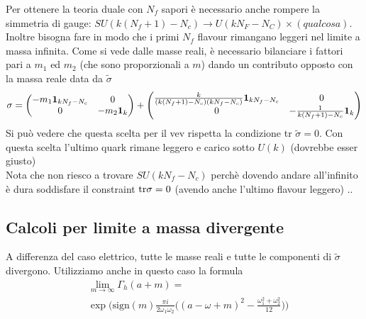 \documentclass[a4paper,12pt]{article}
\begin{document}
Per ottenere la teoria duale con $N_f$ sapori è necessario anche rompere la simmetria di gauge: $SU(k(N_f+1) -N_c) \rightarrow U( k N_F - N_C) \times (qualcosa)$. Inoltre bisogna fare in modo che i primi $N_f$ flavour rimangano leggeri nel limite a massa infinita. Come si vede dalle masse reali, è necessario bilanciare i fattori pari a $m_1$ ed $m_2$ (che sono proporzionali a $m$) dando un contributo opposto con la massa reale data da $\tilde{\sigma}$
\begin{equation}
 \sigma = 
 \begin{pmatrix}
  - m_1 \bold{ 1}_{ k N_f - N_c} & 0 \\
  0 &  - m_2 \bold{ 1}_{k}
 \end{pmatrix}
+
\begin{pmatrix}
   \frac{k}{( k(N_f+1)-N_c)( k N_f - N_c)} \bold{ 1}_{ k N_f - N_c} & 0 \\
  0 &  - \frac{1}{ k(N_f+1)-N_c} \bold{ 1}_{k}
\end{pmatrix}
\end{equation}
Si può vedere che questa scelta per il vev rispetta la condizione tr $\tilde{\sigma} = 0$.
Con questa scelta l'ultimo quark rimane leggero e carico sotto $U(k)$ (dovrebbe esser giusto)\\
Nota che non riesco a trovare $SU( k N_f - N_c)$ perchè dovendo andare all'infinito è dura soddisfare il constraint $ \hbox{tr} \sigma = 0$ (avendo anche l'ultimo flavour leggero) ..
\subsection{Calcoli per limite a massa divergente}
A differenza del caso elettrico, tutte le masse reali e tutte le componenti di $\tilde{\sigma}$ divergono.
Utilizziamo anche in questo caso la formula 
\begin{align}
&\lim_{ m \rightarrow \infty } \Gamma_h ( a +  m) = \\
& \exp \bigg( \mbox{sign} (m) \frac{\pi i }{2 \omega_1 \omega_2} \bigg( ( a - \omega + m)^2 - \frac{\omega_1^2 + \omega_2^2}{12} \bigg) \bigg)
\label{eqn:gamma_lim_m}
\end{align}
\end{document}
